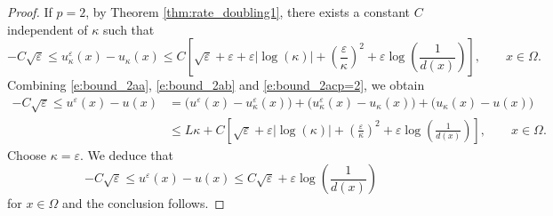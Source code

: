 \documentclass[11pt,reqno]{amsart}
\numberwithin{figure}{section}
\theoremstyle{plain}
\newtheorem{thm}{Theorem}[section]
\theoremstyle{remark}
\numberwithin{equation}{section}
\newcommand{\R}{\mathbb{R}}
\begin{document}
\begin{proof}
\noindent If $p=2$, by Theorem \ref{thm:rate_doubling1}, there exists a constant $C$ independent of $\kappa$ such that
\begin{equation}\label{e:bound_2acp=2}
    -C\sqrt{\varepsilon}\leq u^\varepsilon_\kappa(x) - u_\kappa(x) \leq C\left[\sqrt{\varepsilon} + \varepsilon + \varepsilon |\log(\kappa)|+\left(\frac{\varepsilon}{\kappa}\right)^2 + \varepsilon\log\left(\frac{1}{d(x)}\right)\right], \qquad x\in \Omega.
\end{equation}
Combining \eqref{e:bound_2aa}, \eqref{e:bound_2ab} and \eqref{e:bound_2acp=2}, we obtain
\begin{equation*}
\begin{split}
   -C\sqrt{\varepsilon}\leq u^\varepsilon(x) - u(x) &= \Big(u^\varepsilon(x) - u^\varepsilon_\kappa(x)\Big) + \Big(u^\varepsilon_\kappa(x) - u_\kappa(x)\Big) + \Big(u_\kappa(x) - u(x)\Big) \\
    &\leq L\kappa + C\left[\sqrt{\varepsilon} + \varepsilon|\log(\kappa)| + \left(\frac{\varepsilon}{\kappa}\right)^{2} + \varepsilon\log\left(\frac{1}{d(x)}\right) \right], \qquad x\in \Omega.
\end{split}
\end{equation*}
Choose $\kappa = \varepsilon$. We deduce that
\begin{equation*}
    -C\sqrt{\varepsilon}\leq u^\varepsilon(x) - u(x) \leq C\sqrt{\varepsilon} +\varepsilon\log\left(\frac{1}{d(x)}\right)
\end{equation*}
for $x\in \Omega$ and the conclusion follows. 
\end{proof}




\end{document}
